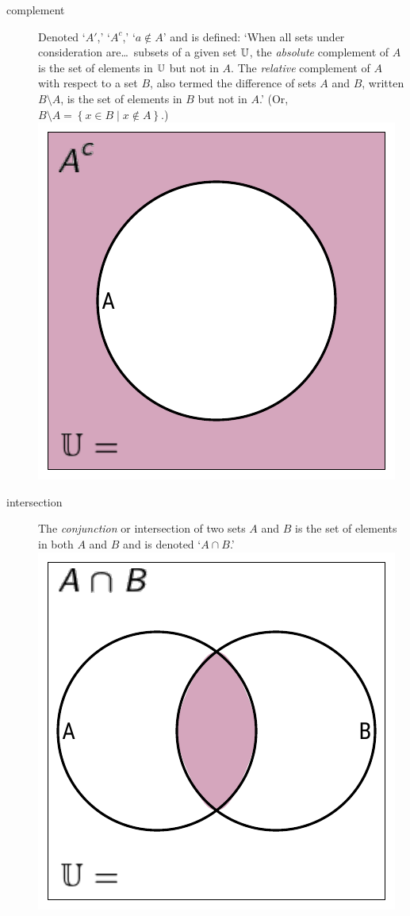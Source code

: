 \documentclass[11pt]{article}%
\begin{document}
\begin{multicols}{2}
\begin{description}
\item[complement] Denoted `$A'$,' `$A^c$,' `$a \notin A$' and is defined: `When all sets under consideration are\dots\ subsets of a given set $\mathbb{U}$, the \textit{absolute} complement of $A$ is the set of elements in $\mathbb{U}$ but not in $A$. The \textit{relative} complement of $A$ with respect to a set $B$, also termed the difference of sets $A$ and $B$, written $B \setminus A$, is the set of elements in $B$ but not in $A$.' \citep{wiki:complement-set-theory} (Or, $B \setminus A = \left\{ x \in B \mid x \notin A \right\}$.) \includegraphics*[scale = 0.75]{../../images/venn-complement.pdf}

\item[intersection] The \textit{conjunction} or intersection of two sets $A$ and $B$ is the set of elements in both $A$ and $B$ and is denoted `$A \cap B$.' \includegraphics*[scale = 0.75]{../../images/venn-2-and.pdf}


\end{description}
\end{multicols}
\end{document}
